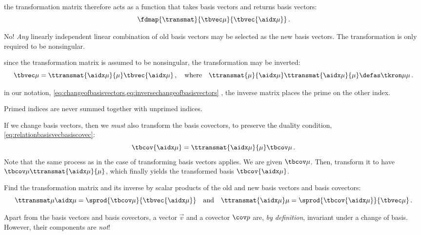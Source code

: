  the transformation matrix therefore acts as a function that takes basis vectors and returns basis vectors:
%
\begin{equation*}
  \fdmap{\transmat}{\tbvec\mu}{\tbvec{\aidx\mu}}\,.
\end{equation*}

 No! \emph{Any} linearly independent linear combination of old basis vectors may be selected as the new basis vectors. The transformation is only required to be nonsingular.

 since the transformation matrix is assumed to be nonsingular, the transformation may be inverted:
%
\begin{equation}\label{eq:inversechangeofbasisvectors}
  \tbvec\mu = \ttransmat{\aidx\mu}{\mu}\tbvec{\aidx\mu}\,,\quad\text{where}\quad
  \ttransmat{\mu}{\aidx\mu}\ttransmat{\aidx\mu}{\mu} \defas\tkron\mu\mu\,.
\end{equation}

 in our notation, \cref{eq:changeofbasisvectors,eq:inversechangeofbasisvectors} , the inverse matrix places the prime on the other index.

 Primed indices are never summed together with unprimed indices.

 If we change basis vectors, then we \emph{must} also transform the basis covectors, to preserve the duality condition, \cref{eq:relationbasisvecbasiscovec}:
%
\begin{equation}\label{eq:transformationofdualbasis}
  \tbcov{\aidx\mu} = \ttransmat{\aidx\mu}{\mu}\tbcov\mu\,.
\end{equation}
%
Note that the same process as in the case of transforming basis vectors applies. We are given $\tbcov\mu$. Then, transform it to have $\tbcov\mu\ttransmat{\aidx\mu}{\mu}$, which finally yields the transformed basis $\tbcov{\aidx\mu}$.

 Find the transformation matrix and its inverse by scalar products of the old and new basis vectors and basis covectors:
%
\begin{equation}\label{eq:transformationmatrixfromscalarproducts}
  \ttransmat\mu{\aidx\mu} = \sprod{\tbcov\mu}{\tbvec{\aidx\mu}}\quad\text{and}\quad
  \ttransmat{\aidx\mu}\mu = \sprod{\tbcov{\aidx\mu}}{\tbvec\mu}\,.
\end{equation}

 Apart from the basis vectors and basis covectors, a vector $\vec v$ and a covector $\cov p$ are, \emph{by definition}, invariant under a change of basis. However, their components are \emph{not}! 

